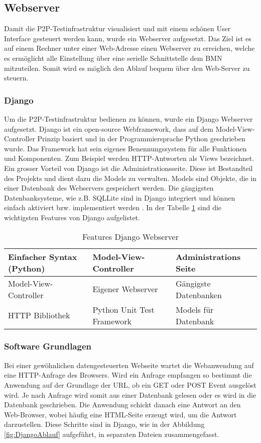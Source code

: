 \subsection{Webserver}\label{subsec:DjangoWebserver}
Damit die P2P-Testinfrastruktur visualisiert und mit einem schönen User Interface gesteuert werden kann, wurde ein Webserver aufgesetzt. Das Ziel ist es auf einem Rechner unter einer Web-Adresse einen Webserver zu erreichen, welche es ermöglicht alle Einstellung über eine serielle Schnittstelle dem BMN mitzuteilen. Somit wird es möglich den Ablauf bequem über den Web-Server zu steuern.
\subsubsection{Django}\label{subsubsec:Django}
Um die P2P-Testinfrastruktur bedienen zu können, wurde ein Django Webserver aufgesetzt.
Django ist ein open-source Webframework, dass auf dem Model-View-Controller Prinzip basiert und in der Programmiersprache Python geschrieben wurde.
Das Framework hat sein eigenes Benennungssystem für alle Funktionen und Komponenten.
Zum Beispiel werden HTTP-Antworten als Views bezeichnet.
Ein grosser Vorteil von Django ist die Administrationsseite.
Diese ist Bestandteil des Projekts und dient dazu die Models zu verwalten. Models sind Objekte, die in einer Datenbank des Webservers gespeichert werden. Die gängigsten Datenbanksysteme, wie z.B. SQLLite sind in Django integriert und können einfach aktiviert bzw. implementiert werden \cite{django_django_2020}. In der Tabelle \ref{table:FeaturesDjango} sind die wichtigsten Features von Django aufgelistet.


\begin{table}[h]
\centering
\begin{tabular}{|l|l|l|} 
\hline
Einfacher Syntax (Python) & Model-View-Controller & Administrations Seite \\ 
\hline
Model-View-Controller & Eigener Webserver & Gängigste Datenbanken \\ 
\hline
HTTP Bibliothek & Python Unit Test Framework & Models für Datenbank \\
\hline
\end{tabular}
\caption{Features Django Webserver \cite{django_django_2020}}
\label{table:FeaturesDjango}
\end{table}

\subsubsection{Software Grundlagen}\label{subsubsec:SoftwareGrundlagen}
Bei einer gewöhnlichen datengesteuerten Webseite wartet die Webanwendung auf eine HTTP-Anfrage des Browsers.
Wird ein Anfrage empfangen so bestimmt die Anwendung auf der Grundlage der URL, ob ein GET oder POST Event ausgelöst wird.
Je nach Anfrage wird somit aus einer Datenbank gelesen oder es wird in die Datenbank geschrieben.
Die Anwendung schickt danach eine Antwort an den Web-Browser, wobei häufig eine HTML-Seite erzeugt wird, um die Antwort darzustellen. Diese Schritte sind in Django, wie in der Abbildung \ref{fig:DjangoAblauf} aufgeführt,  in separaten Dateien zusammengefasst.


